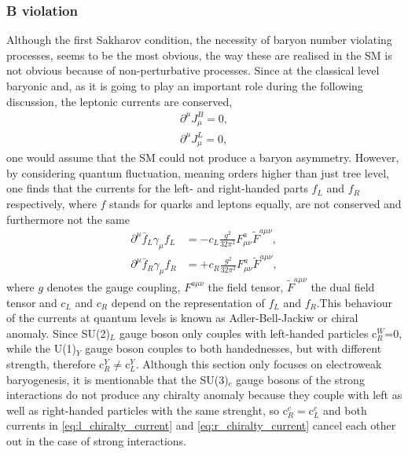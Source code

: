 \subsubsection{B violation}
Although the first Sakharov condition, the necessity of baryon number violating processes, seems to be the most obvious, the way these are realised in the SM is not obvious because of non-perturbative processes. \newline\indent
Since at the classical level baryonic and, as it is going to play an important role during the following discussion, the leptonic currents are conserved,
\begin{align}
	\partial^\mu J_\mu^B=0,
	\label{eq:Bcurrent}
	\\
	\partial^\mu J_\mu^L=0,
	\label{eq:Lcurrent}
\end{align}
one would assume that the SM could not produce a baryon asymmetry. However, by considering quantum fluctuation, meaning orders higher than just tree level, one finds that the currents for the left- and right-handed parts $f_L$ and $f_R$ respectively, where $f$ stands for quarks and leptons equally, are not conserved and furthermore not the same \cite{Bernreuther:2002uj}
\begin{align}
	\partial^\mu\bar{f}_L\gamma_\mu f_L&=-c_L\frac{g^2}{32\pi^2}F^a_{\mu\nu}\tilde{F}^{a\mu\nu},
	\label{eq:l_chiralty_current}
	\\
	\partial^\mu\bar{f}_R\gamma_\mu f_R&=+c_R\frac{g^2}{32\pi^2}F^a_{\mu\nu}\tilde{F}^{a\mu\nu},
	\label{eq:r_chiralty_current}
\end{align}
where $g$ denotes the gauge coupling, $F^{a\mu\nu}$ the field tensor, $\tilde{F}^{a\mu\nu}$ the dual field tensor and $c_L$ and $c_R$ depend on the representation of $f_L$ and $f_R$.This behaviour of the currents at quantum levels is known as Adler-Bell-Jackiw or chiral anomaly. 
Since SU(2)$_L$ gauge boson only couples with left-handed particles c$_R^W$=0, while the U(1)$_Y$ gauge boson couples to both handednesses, but with different strength, therefore c$_R^Y\neq$c$_L^Y$. Although this section only focuses on electroweak baryogenesis, it is mentionable that the SU(3)$_c$ gauge bosons of the strong interactions do not produce any chiralty anomaly because they couple with left as well as right-handed particles with the same strenght, so c$_R^c=$c$_L^c$ and both currents in \eqref{eq:l_chiralty_current} and \eqref{eq:r_chiralty_current} cancel each other out in the case of strong interactions\cite{Bernreuther:2002uj}. \newline\indent
